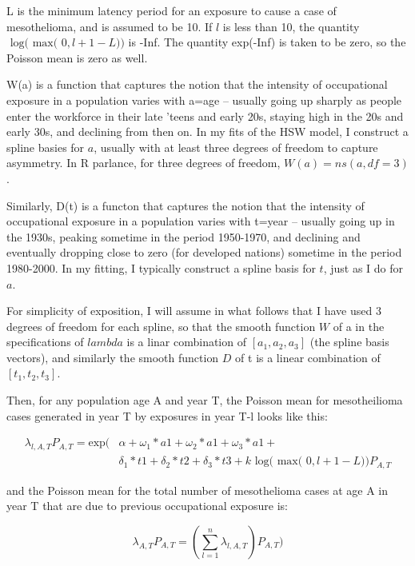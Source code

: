 \documentclass[paper=letter,listof=leveldown,appendixprefix=true]{scrreprt}\usepackage{graphicx, color}
\begin{document}
L is the minimum latency period for an exposure to cause a case of mesothelioma, and is assumed to be 10.  If $l$ is less than 10, the quantity $\text{ log( max( } 0, l + 1 - L))$ is -Inf.  The quantity exp(-Inf) is taken to be zero, so the Poisson mean is zero as well.

W(a) is a function that captures the notion that the intensity of occupational exposure in a population varies with a=age -- usually going up sharply as people enter the workforce in their late 'teens and early 20s, staying high in the 20s and early 30s, and declining from then on.  In my fits of the HSW model, I construct a spline basies for $a$, usually with at least three degrees of freedom to capture asymmetry.  In R parlance, for three degrees of freedom, $W(a) = ns(a,df=3)$.

Similarly, D(t) is a functon that captures the notion that the intensity of occupational exposure in a population varies with t=year -- usually going up in the 1930s, peaking sometime in the period 1950-1970, and declining and eventually dropping close to zero (for developed nations) sometime in the period 1980-2000.  In my fitting, I typically construct a spline basis for $t$, just as I do for $a$.

For simplicity of exposition, I will assume in what follows that I have used 3 degrees of freedom for each spline, so that the smooth function $W$ of a in the specifications of $lambda$ is a linar combination of $[a_1, a_2, a_3]$ (the spline basis vectors), and similarly the smooth function $D$ of t is a linear combination of $[t_1, t_2, t_3]$.

Then, for any population age A and year T, the Poisson mean for mesotheilioma cases generated in year T by   exposures in year T-l looks like this:

\begin{align*}
\lambda_{l,A,T}P_{A,T} = \text{exp}( &\alpha + \omega_1*a1 + \omega_2*a1 + \omega_3*a1 + \\  
 &\delta_1*t1 + \delta_2*t2 + \delta_3*t3 + k\text{ log( max( } 0, l + 1 - L))P_{A,T} 
\end{align*}

and the Poisson mean for the total number of mesothelioma cases at age A in year T that are due to previous occupational exposure is:

\begin{equation*}
\lambda_{A,T}P_{A,T} = (\sum\limits_{l=1}^n \lambda_{l,A,T}) P_{A,T})
\end{equation*} 
\end{document}
